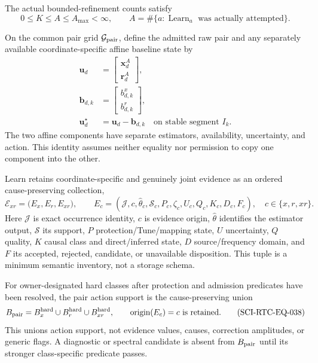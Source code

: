 The actual bounded-refinement counts satisfy
\begin{equation}
 0\le K\le A\le A_{\max}<\infty,
 \qquad
 A=\#\{a:\operatorname{Learn}_a\text{ was actually attempted}\}.
 \tag{SCI-RTC-EQ-035}\label{eq:actual-attempts}
\end{equation}

On the common pair grid $\mathcal G_{\rm pair}$, define the admitted raw pair
and any separately available coordinate-specific affine baseline state by
\begingroup\small
\begin{equation}
 \begin{aligned}
 \mathbf u_d&=\begin{bmatrix}\mathbf x^A_d\\\mathbf r^A_d\end{bmatrix},\\
 \mathbf b_{d,k}&=\begin{bmatrix}b^x_{d,k}\\b^r_{d,k}\end{bmatrix},\\
 \mathbf u_d^\star&=\mathbf u_d-\mathbf b_{d,k}
 \quad\text{on stable segment }I_k .
 \end{aligned}
 \tag{SCI-RTC-EQ-036}\label{eq:paired-conditioned-r}
\end{equation}
\endgroup
The two affine components have separate estimators, availability, uncertainty,
and action.  This identity assumes neither equality nor permission to copy one
component into the other.

Learn retains coordinate-specific and genuinely joint evidence as an ordered
cause-preserving collection,
\begin{equation}
 \mathcal E_{xr}=\bigl(E_x,E_r,E_{xr}\bigr),\qquad
 E_c=(\mathcal J, c, \widehat\theta_c,\mathcal S_c,
 P_c,\zeta_c,U_c,Q_c,K_c,D_c,F_c),
 \quad c\in\{x,r,xr\}.
 \tag{SCI-RTC-EQ-037}\label{eq:paired-evidence}
\end{equation}
Here $\mathcal J$ is exact occurrence identity, $c$ is evidence origin,
$\widehat\theta$ identifies the estimator output, $\mathcal S$ its support,
$P$ protection/Tune/mapping state, $U$ uncertainty, $Q$ quality, $K$ causal
class and direct/inferred state, $D$ source/frequency domain, and $F$ its
accepted, rejected, candidate, or unavailable disposition.  This tuple is a
minimum semantic inventory, not a storage schema.

For owner-designated hard classes after protection and admission predicates
have been resolved, the pair action support is the cause-preserving union
\begin{equation}
 B_{\rm pair}=B_x^{\rm hard}\cup B_r^{\rm hard}
                    \cup B_{xr}^{\rm hard},
 \qquad
 \operatorname{origin}(E_c)=c\ \text{is retained}.
 \tag{SCI-RTC-EQ-038}\label{eq:hard-pair-union}
\end{equation}
This unions action support, not evidence values, causes, correction
amplitudes, or generic flags.  A diagnostic or spectral candidate is absent
from $B_{\rm pair}$ until its stronger class-specific predicate passes.

